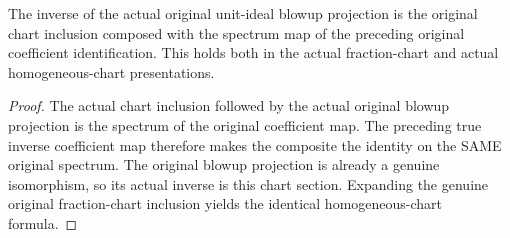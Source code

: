 \begin{theorem}
\label{thm:fc-original-unit-rees-chart-section}
\leanok
{}
The inverse of the actual original unit-ideal blowup projection is
the original chart inclusion composed with the spectrum map of the
preceding original coefficient identification. This holds both in
the actual fraction-chart and actual homogeneous-chart presentations.
\end{theorem}
\begin{proof}
The actual chart inclusion followed by the actual original blowup
projection is the spectrum of the original coefficient map. The
preceding true inverse coefficient map therefore makes the composite
the identity on the SAME original spectrum. The original blowup
projection is already a genuine isomorphism, so its actual inverse
is this chart section. Expanding the genuine original fraction-chart
inclusion yields the identical homogeneous-chart formula.
\end{proof}
